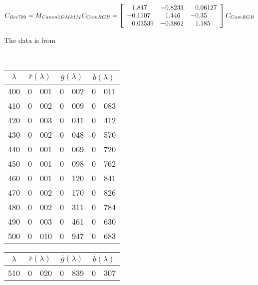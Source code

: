 \begin{displaymath}
C_{Rec709} = M_{Canon1DMkIII} C_{CamRGB} = \left[\begin{array}{r@{.}lr@{.}lr@{.}l}
 1&847   & -0&8233 &  0&06127  \\
-0&1107  &  1&446  & -0&35 \\
 0&03539 & -0&3862 &  1&185  \\
\end{array}\right] C_{CamRGB}
\end{displaymath}

The data is from~\cite{jiang2013}

{
\small
{
\noindent\resizebox{\linewidth}{!}{}\\
\setlength{\tabcolsep}{.35em}
\begin{minipage}{.3\textwidth}
\centering
\begin{tabular}{c|r@{.}l | r@{.}l | r@{.}l}
$\lambda$ & \multicolumn{2}{c|}{$\bar r(\lambda)$} &  \multicolumn{2}{c|}{$\bar g(\lambda)$} &  \multicolumn{2}{c}{$\bar b(\lambda)$} \\
\hline
 400 &   0&001 &   0&002 &   0&011 \\
 410 &   0&002 &   0&009 &   0&083 \\
 420 &   0&003 &   0&041 &   0&412 \\
 430 &   0&002 &   0&048 &   0&570 \\
 440 &   0&001 &   0&069 &   0&720 \\
 450 &   0&001 &   0&098 &   0&762 \\
 460 &   0&001 &   0&120 &   0&841 \\
 470 &   0&002 &   0&170 &   0&826 \\
 480 &   0&002 &   0&311 &   0&784 \\
 490 &   0&003 &   0&461 &   0&630 \\
 500 &   0&010 &   0&947 &   0&683 \\
\end{tabular}
\end{minipage}\hfill
\begin{minipage}{.3\textwidth}
\centering
\begin{tabular}{c|r@{.}l | r@{.}l | r@{.}l}
$\lambda$ & \multicolumn{2}{c|}{$\bar r(\lambda)$} &  \multicolumn{2}{c|}{$\bar g(\lambda)$} &  \multicolumn{2}{c}{$\bar b(\lambda)$} \\
\hline
 510 &   0&020 &   0&839 &   0&307 \\

\end{tabular}
\end{minipage}}}
